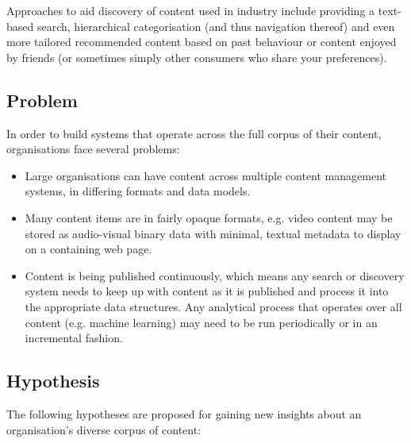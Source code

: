 \documentclass{sig-alternate-05-2015}
\begin{document}
Approaches to aid discovery of content used in industry include providing a
text-based search, hierarchical
categorisation (and thus navigation thereof) and even more tailored recommended
content based on past behaviour or content enjoyed by friends (or sometimes
simply other consumers who share your preferences).

\subsection{Problem}

In order to build systems
that operate across the full corpus of their content, organisations face
several problems:

\begin{itemize}

\item Large organisations can have content across multiple content management
systems, in differing formats and data models.

\item Many content items are in fairly opaque formats, e.g. video content may be
stored as audio-visual binary data with minimal, textual metadata to display on
a containing web page.

\item Content is being published continuously, which means any search or
discovery system needs to keep up with content as it is published and process it
into the appropriate data structures. Any analytical process that operates
over all content (e.g. machine learning) may need to be run periodically or in
an incremental fashion.

\end{itemize}

\subsection{Hypothesis}

The following hypotheses are proposed for gaining new insights about an
organisation's diverse corpus of content:
\end{document}
